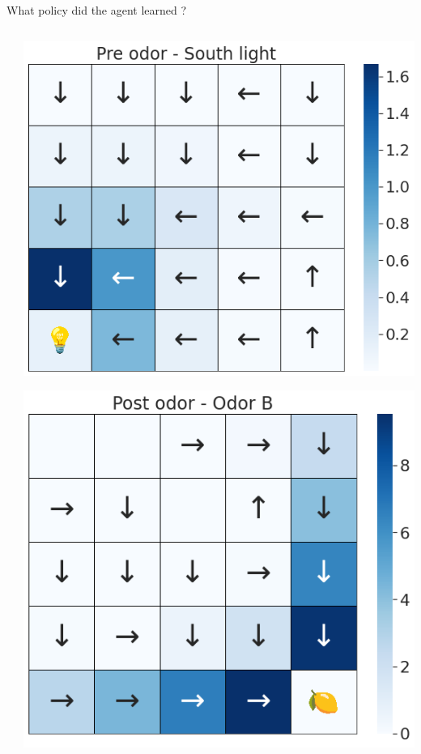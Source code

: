 \documentclass[bigger]{beamer}
\begin{document}
\begin{frame}[label={sec:orgfd1915a}]{What policy did the agent learned ?}
\begin{columns}
\begin{column}[t]{0.5\columnwidth}
\begin{center}
\end{center}
\end{column}
\begin{column}[t]{0.5\columnwidth}
\begin{center}
\includegraphics[height=0.4\textheight]{img/policy-allo-south-light.png}
\end{center}
\begin{center}
\includegraphics[height=0.4\textheight]{img/policy-allo-odor-B.png}
\end{center}
\end{column}
\end{columns}
\end{frame}
\end{document}
